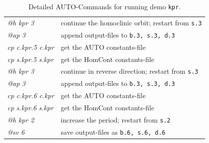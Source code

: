 \documentclass[12pt]{report}
\begin{document}
\begin{table}[htbp]
\begin{center}
\begin{tabular}{| l | l |}
  {\it @h kpr 3} & continue the homoclinic orbit; restart from {\tt s.3} \\ 
  {\it @ap 3} & append output-files to {\tt b.3, s.3, d.3} \\ 
\hline
  {\it cp c.kpr.5 c.kpr} & get the AUTO constants-file \\ 
  {\it cp s.kpr.5 s.kpr} & get the HomCont constants-file \\
  {\it @h kpr 3} & continue in reverse direction; restart from {\tt s.3} \\
  {\it @ap 3} & append output-files to {\tt b.3, s.3, d.3} \\ 
\hline
  {\it cp c.kpr.6 c.kpr} & get the AUTO constants-file \\ 
  {\it cp s.kpr.6 s.kpr} & get the HomCont constants-file \\ 
  {\it @h kpr 2} & increase the period; restart from {\tt s.2} \\ 
  {\it @sv 6} & save output-files as {\tt b.6, s.6, d.6} \\ 
\hline
\end{tabular}
\caption{Detailed {\cal AUTO}-Commands for running demo {\tt kpr}.}
\label{tbl:demo_kpr_1}
\end{center}
\end{table}
\end{document}
